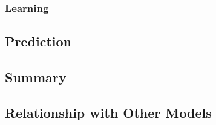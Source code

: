 \subsubsection{Learning}

\subsection{Prediction}

\subsection{Summary}



\subsection{Relationship with Other Models}